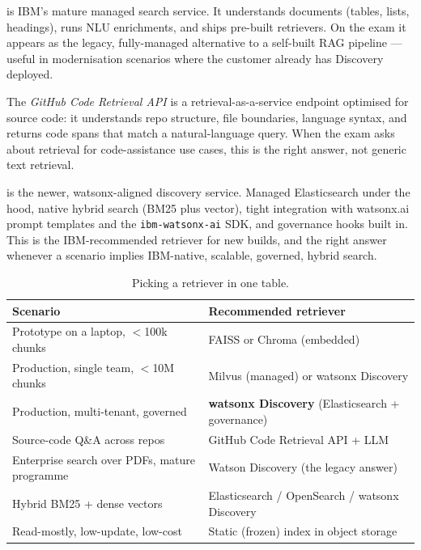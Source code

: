  is IBM's mature managed search service. It understands documents (tables, lists, headings), runs NLU enrichments, and ships pre-built retrievers. On the exam it appears as the legacy, fully-managed alternative to a self-built RAG pipeline --- useful in modernisation scenarios where the customer already has Discovery deployed.

The \emph{GitHub Code Retrieval API} is a retrieval-as-a-service endpoint optimised for source code: it understands repo structure, file boundaries, language syntax, and returns code spans that match a natural-language query. When the exam asks about retrieval for code-assistance use cases, this is the right answer, not generic text retrieval.

 is the newer, watsonx-aligned discovery service. Managed Elasticsearch under the hood, native hybrid search (BM25 plus vector), tight integration with watsonx.ai prompt templates and the \texttt{ibm-watsonx-ai} SDK, and governance hooks built in. This is the IBM-recommended retriever for new builds, and the right answer whenever a scenario implies IBM-native, scalable, governed, hybrid search.

\begin{table}[h]
\centering
\small
\begin{tabularx}{\textwidth}{X X}
\toprule
\textbf{Scenario} & \textbf{Recommended retriever} \\
\midrule
Prototype on a laptop, $<$100k chunks       & FAISS or Chroma (embedded) \\
Production, single team, $<$10M chunks      & Milvus (managed) or watsonx Discovery \\
Production, multi-tenant, governed           & \textbf{watsonx Discovery} (Elasticsearch + governance) \\
Source-code Q\&A across repos                & GitHub Code Retrieval API + LLM \\
Enterprise search over PDFs, mature programme & Watson Discovery (the legacy answer) \\
Hybrid BM25 + dense vectors                  & Elasticsearch / OpenSearch / watsonx Discovery \\
Read-mostly, low-update, low-cost            & Static (frozen) index in object storage \\
\bottomrule
\end{tabularx}
\caption{Picking a retriever in one table.}
\label{tab:retriever-picks}
\end{table}


